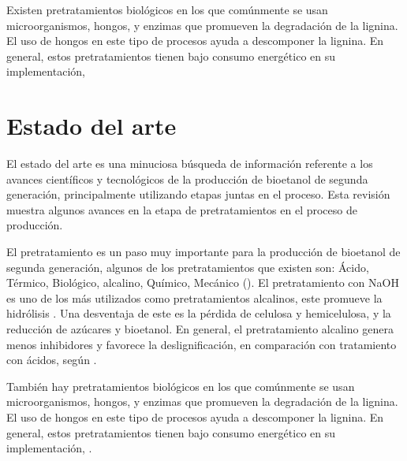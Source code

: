 \documentclass[12pt]{article}
\begin{document}
Existen pretratamientos biológicos en los que comúnmente se usan microorganismos, hongos, y enzimas que promueven la degradación de la lignina. El uso de hongos en este tipo de procesos ayuda a descomponer la lignina. En general, estos pretratamientos tienen bajo consumo energético en su implementación, %









	
	
		\section{Estado del arte}

	\label{Estado del arte}
El estado del arte es una minuciosa búsqueda de información referente a los avances científicos y tecnológicos de la producción de bioetanol de segunda generación, principalmente utilizando etapas juntas en el proceso. Esta revisión muestra algunos avances en la etapa de pretratamientos en el proceso de producción.

El pretratamiento es un paso muy importante para la producción de bioetanol de segunda generación, algunos de los pretratamientos que existen son: Ácido, Térmico, Biológico, alcalino, Químico, Mecánico (\cite{ADITIYA2016631}).
El pretratamiento con NaOH es uno de los más utilizados como pretratamientos alcalinos, este promueve la hidrólisis \cite{espinosa2021pretratamiento}. Una desventaja de este es la pérdida de celulosa y hemicelulosa, y la reducción de azúcares y bioetanol.
En general, el pretratamiento alcalino genera menos inhibidores y favorece la deslignificación, en comparación con tratamiento con ácidos, según \cite{valles2022estudio}. 

También hay pretratamientos biológicos en los que comúnmente se usan microorganismos, hongos, y enzimas que promueven la degradación de la lignina. El uso de hongos en este tipo de procesos ayuda a descomponer la lignina. En general, estos pretratamientos tienen bajo consumo energético en su implementación, \cite{Gonzalez2018desarrollo}.  
\end{document}
